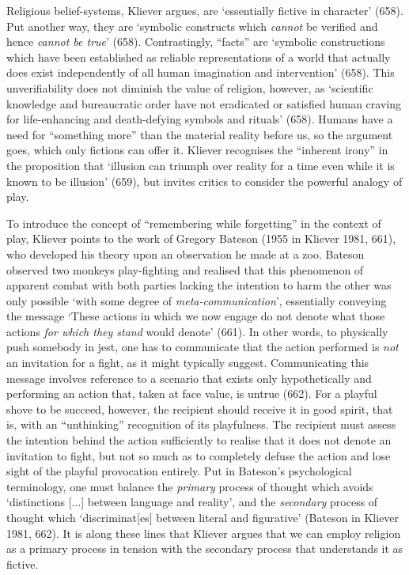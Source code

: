 \documentclass[Draft.tex]{subfiles}
\begin{document}
Religious belief-systems, Kliever argues,
are `essentially fictive in character' (658).
Put another way, they are
`symbolic constructs which \textit{cannot} be verified
and hence \textit{cannot be true}' (658).
Contrastingly, ``facts'' are
`symbolic constructions which have been established as
reliable representations of a world that actually does exist
independently of all human imagination and intervention' (658).
This unverifiability does not diminish the value of religion,
however, as `scientific knowledge and bureaucratic order
have not eradicated or satisfied human craving
for life-enhancing and death-defying symbols and rituals' (658).
Humans have a need for ``something more'' than
the material reality before us, so the argument goes,
which only fictions can offer it.
Kliever recognises the ``inherent irony'' in the proposition that
`illusion can triumph over reality for a time
even while it is known to be illusion' (659),
but invites critics to consider the powerful analogy of play.

To introduce the concept of ``remembering while forgetting''
in the context of play, Kliever points to the work of
Gregory Bateson (1955 in Kliever 1981, 661),
who developed his theory upon an observation he made at a zoo.
Bateson observed two monkeys play-fighting and realised that
this phenomenon of apparent combat with both parties lacking
the intention to harm the other was only possible
`with some degree of \textit{meta-communication}',
essentially conveying the message
`These actions in which we now engage do not denote
what those actions \textit{for which they stand} would denote' (661).
In other words, to physically push somebody in jest,
one has to communicate that the action performed
is \textit{not} an invitation for a fight, as it might typically suggest.
Communicating this message involves reference to
a scenario that exists only hypothetically and
performing an action that, taken at face value, is untrue (662).
For a playful shove to be succeed, however,
the recipient should receive it in good spirit, that is,
with an ``unthinking'' recognition of its playfulness.
The recipient must assess the intention behind the action sufficiently
to realise that it does not denote an invitation to fight,
but not so much as to completely defuse the action
and lose sight of the playful provocation entirely.
Put in Bateson's psychological terminology,
one must balance the \textit{primary} process of thought which
avoids `distinctions [...] between language and reality',
and the \textit{secondary} process of thought
which `discriminat[es] between literal and figurative'
(Bateson in Kliever 1981, 662).
It is along these lines that Kliever argues that we can
employ religion as a primary process in tension with
the secondary process that understands it as fictive.
\end{document}
